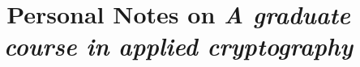 \documentclass{report}
\begin{document}
\title{Personal Notes on \em{A graduate course in applied cryptography}}
\maketitle
 
\tableofcontents



 
\end{document}
